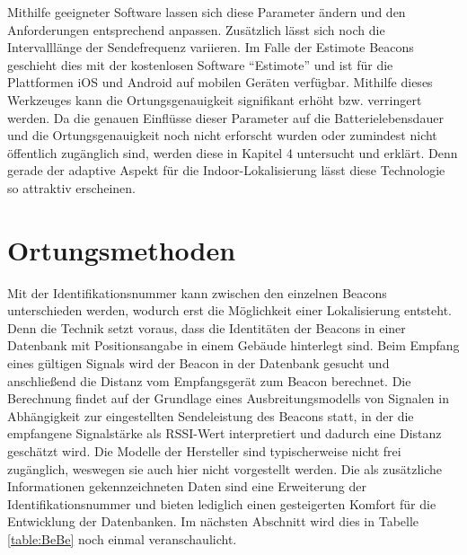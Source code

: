 Mithilfe geeigneter Software lassen sich diese Parameter ändern und den Anforderungen entsprechend anpassen. Zusätzlich lässt sich noch die Intervalllänge der Sendefrequenz variieren. Im Falle der Estimote Beacons geschieht dies mit der kostenlosen Software "`Estimote"' und ist für die Plattformen iOS und Android auf mobilen Geräten verfügbar. Mithilfe dieses Werkzeuges kann die Ortungsgenauigkeit signifikant erhöht bzw. verringert werden. Da die genauen Einflüsse dieser Parameter auf die Batterielebensdauer und die Ortungsgenauigkeit noch nicht erforscht wurden oder zumindest nicht öffentlich zugänglich sind, werden diese in Kapitel 4 untersucht und erklärt. Denn gerade der adaptive Aspekt für die Indoor-Lokalisierung lässt diese Technologie so attraktiv erscheinen.
\section{Ortungsmethoden}
Mit der Identifikationsnummer kann zwischen den einzelnen Beacons unterschieden werden, wodurch erst die Möglichkeit einer Lokalisierung entsteht. Denn die Technik setzt voraus, dass die Identitäten der Beacons in einer Datenbank mit Positionsangabe in einem Gebäude hinterlegt sind. Beim Empfang eines gültigen Signals wird der Beacon in der Datenbank gesucht und anschließend die Distanz vom Empfangsgerät zum Beacon berechnet. Die Berechnung findet auf der Grundlage eines Ausbreitungsmodells von Signalen in Abhängigkeit zur eingestellten Sendeleistung des Beacons statt, in der die empfangene Signalstärke als RSSI-Wert interpretiert und dadurch eine Distanz geschätzt wird. Die Modelle der Hersteller sind typischerweise nicht frei zugänglich, weswegen sie auch hier nicht vorgestellt werden. Die als zusätzliche Informationen gekennzeichneten Daten sind eine Erweiterung der Identifikationsnummer und bieten lediglich einen gesteigerten Komfort für die Entwicklung der Datenbanken. Im nächsten Abschnitt wird dies in Tabelle \ref{table:BeBe} noch einmal veranschaulicht.\\
